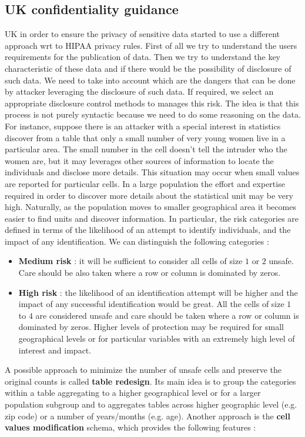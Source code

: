 \subsection{UK confidentiality guidance}
UK in order to ensure the privacy of sensitive data started to use a different approach wrt to HIPAA privacy rules. First of all we try to understand the users requirements for the publication of data. Then we try to understand the key characteristic of these data and if there would be the possibility of disclosure of such data. We need to take into account which are the dangers that can be done by attacker leveraging the disclosure of such data. If required, we select an appropriate disclosure control methods to manages this risk. The idea is that this process is not purely syntactic because we need to do some reasoning on the data. For instance, suppose there is an attacker with a special interest in statistics discover from a table that only a small number of very young women live in a particular area. The small number in the cell doesn't tell the intruder who the women are, but it may leverages other sources of information to locate the individuals and disclose more details. This situation may occur when small values are reported for particular cells. In a large population the effort and expertise required in order to discover more details about the statistical unit may be very high. Naturally, as the population moves to smaller geographical area it becomes easier to find units and discover information. In particular, the risk categories are defined in terms of the likelihood of an attempt to identify individuals, and the impact of any identification. We can distinguish the following categories :
\begin{itemize}
\item \textbf{Medium risk} : it will be sufficient to consider all cells of size $1$ or $2$ unsafe. Care should be also taken where a row or column is dominated by zeros.
\item \textbf{High risk} : the likelihood of an identification attempt will be higher and the impact of any successful identification would be great. All the cells of size $1$ to $4$ are considered unsafe and care should be taken where a row or column is dominated by zeros. Higher levels of protection may be required for small geographical levels or for particular variables with an extremely high level of interest and impact.
\end{itemize}
A possible approach to minimize the number of unsafe cells and preserve the original counts is called \textbf{table redesign}. Its main idea is to group the categories within a table aggregating to a higher geographical level or for a larger population subgroup and to aggregates tables across higher geographic level (e.g. zip code) or a number of years/months (e.g. age). Another approach is the \textbf{cell values modification} schema, which provides the following features :
